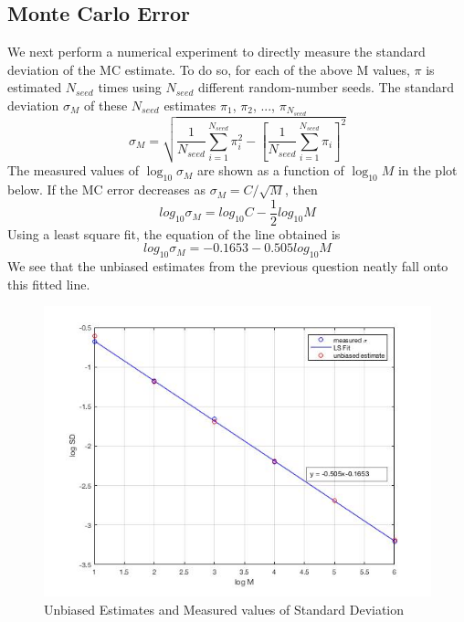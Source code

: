 \documentclass[12pt, oneside]{article}   	%
\begin{document}
\subsection{Monte Carlo Error}
We next perform a numerical experiment to directly measure the standard deviation of the MC estimate. To do so, for each of the above M values, $\pi$ is estimated $N_{seed}$ times using $N_{seed}$ different random-number seeds. The standard deviation $\sigma_M$ of these $N_{seed}$ estimates $\pi_1$, $\pi_2$, ..., $\pi_{N_{seed}}$
	\begin{equation}
	\sigma_M = \sqrt{\frac{1}{N_{seed}} \sum\limits_{i=1}^{N_{seed}} \pi_i^2 - \left[ \frac{1}{N_{seed}}\sum\limits_{i=1}^{N_{seed}} \pi_i\right]^2 }
	\end{equation}
The measured values of $\log_{10} \sigma_M$ are shown as a function of $\log_{10} M$ in the plot below. If the MC error decreases as $\sigma_M = C/\sqrt{M}$, then  
$$log_{10}\sigma_M = log_{10}C - \frac{1}{2} log_{10}M $$
Using a least square fit, the equation of the line obtained is
 $$log_{10}\sigma_M = -0.1653 - 0.505 log_{10}M $$
We see that the unbiased estimates from the previous question neatly fall onto this fitted line.
 	\begin{figure} [!htbp]
	\centering
	 \includegraphics[scale=0.5]{stdv_fit.jpg}
	\caption{Unbiased Estimates and Measured values of Standard Deviation}
	\end{figure}
	
\end{document}
